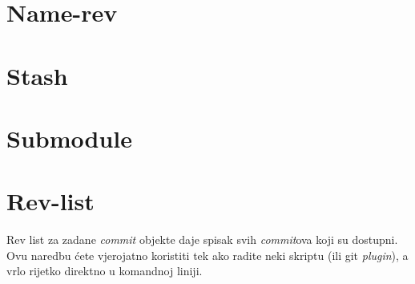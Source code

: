 \section*{Name-rev}

\TODO

\section*{Stash}

\TODO

\section*{Submodule}

\TODO

\section*{Rev-list}

Rev list za zadane \emph{commit} objekte daje spisak svih \emph{commit}ova koji su dostupni.
Ovu naredbu ćete vjerojatno koristiti tek ako radite neki skriptu (ili git \emph{plugin}), a vrlo rijetko direktno u komandnoj liniji.

